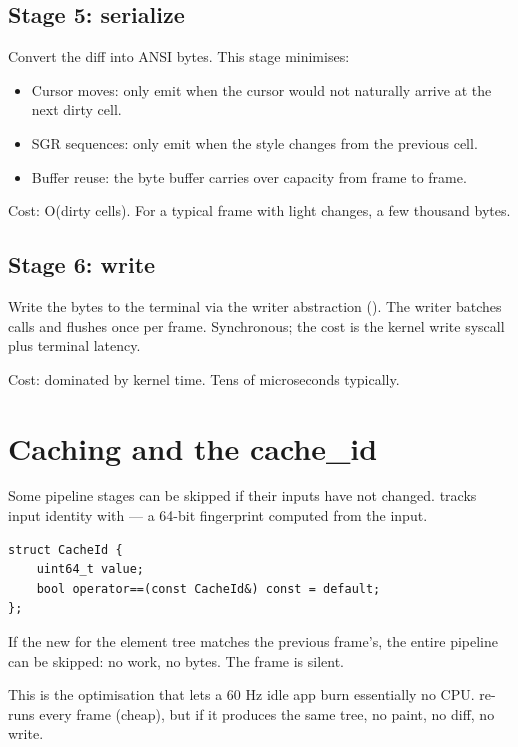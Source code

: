 \subsection*{Stage 5: serialize}

Convert the diff into ANSI bytes. This stage minimises:

\begin{itemize}[leftmargin=*]
  \item Cursor moves: only emit when the cursor would not
    naturally arrive at the next dirty cell.
  \item SGR sequences: only emit when the style changes from the
    previous cell.
  \item Buffer reuse: the byte buffer carries over capacity from
    frame to frame.
\end{itemize}

Cost: O(dirty cells). For a typical frame with light changes, a
few thousand bytes.

\subsection*{Stage 6: write}

Write the bytes to the terminal via the writer abstraction
(). The writer
batches calls and flushes once per frame. Synchronous; the cost
is the kernel write syscall plus terminal latency.

Cost: dominated by kernel time. Tens of microseconds typically.

\section{Caching and the cache\_id}

Some pipeline stages can be skipped if their inputs have not
changed. \maya{} tracks input identity with  ---
a 64-bit fingerprint computed from the input.

\begin{lstlisting}
struct CacheId {
    uint64_t value;
    bool operator==(const CacheId&) const = default;
};
\end{lstlisting}

If the new  for the element tree matches the
previous frame's, the entire pipeline can be skipped: no work,
no bytes. The frame is silent.

This is the optimisation that lets a 60 Hz idle app burn
essentially no CPU.  re-runs every frame (cheap), but
if it produces the same tree, no paint, no diff, no write.

